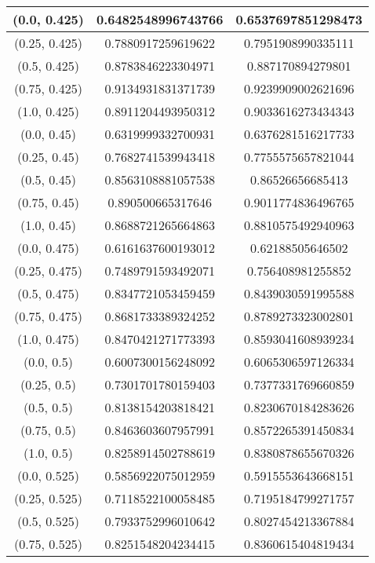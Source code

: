 \begin{table}[H]
\begin{tabular}{|c|c|c|}
\hline
(0.0, 0.425) & 0.6482548996743766 & 0.6537697851298473 \\
\hline
(0.25, 0.425) & 0.7880917259619622 & 0.7951908990335111 \\
\hline
(0.5, 0.425) & 0.8783846223304971 & 0.887170894279801 \\
\hline
(0.75, 0.425) & 0.9134931831371739 & 0.9239909002621696 \\
\hline
(1.0, 0.425) & 0.8911204493950312 & 0.9033616273434343 \\
\hline
\hline
(0.0, 0.45) & 0.6319999332700931 & 0.6376281516217733 \\
\hline
(0.25, 0.45) & 0.7682741539943418 & 0.7755575657821044 \\
\hline
(0.5, 0.45) & 0.8563108881057538 & 0.86526656685413 \\
\hline
(0.75, 0.45) & 0.890500665317646 & 0.9011774836496765 \\
\hline
(1.0, 0.45) & 0.8688721265664863 & 0.8810575492940963 \\
\hline
\hline
(0.0, 0.475) & 0.6161637600193012 & 0.62188505646502 \\
\hline
(0.25, 0.475) & 0.7489791593492071 & 0.756408981255852 \\
\hline
(0.5, 0.475) & 0.8347721053459459 & 0.8439030591995588 \\
\hline
(0.75, 0.475) & 0.8681733389324252 & 0.8789273323002801 \\
\hline
(1.0, 0.475) & 0.8470421271773393 & 0.8593041608939234 \\
\hline
\hline
(0.0, 0.5) & 0.6007300156248092 & 0.6065306597126334 \\
\hline
(0.25, 0.5) & 0.7301701780159403 & 0.7377331769660859 \\
\hline
(0.5, 0.5) & 0.8138154203818421 & 0.8230670184283626 \\
\hline
(0.75, 0.5) & 0.8463603607957991 & 0.8572265391450834 \\
\hline
(1.0, 0.5) & 0.8258914502788619 & 0.8380878655670326 \\
\hline
\hline
(0.0, 0.525) & 0.5856922075012959 & 0.5915553643668151 \\
\hline
(0.25, 0.525) & 0.7118522100058485 & 0.7195184799271757 \\
\hline
(0.5, 0.525) & 0.7933752996010642 & 0.8027454213367884 \\
\hline
(0.75, 0.525) & 0.8251548204234415 & 0.8360615404819434 \\

\end{tabular}
\end{table}
